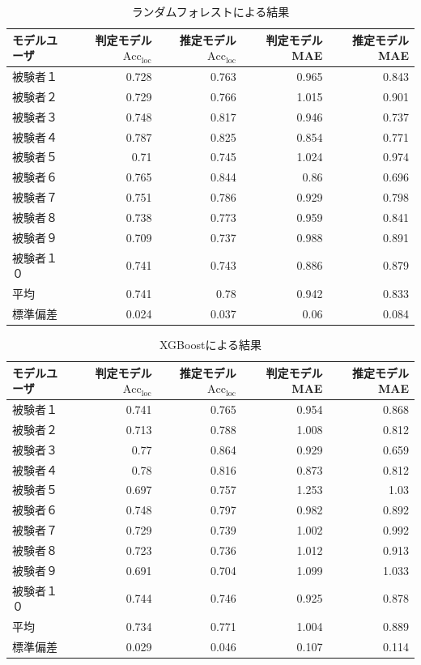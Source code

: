 \documentclass[a4paper,12pt]{jreport}
\begin{document}
\begin{table}[tb]
  \centering
  \caption{ランダムフォレストによる結果}
  \label{tab:RF_Acc}
  \renewcommand{\arraystretch}{1.2}
  \small
  \begin{tabular}{|l|r|r|r|r|}
    \hline
モデルユーザ & 判定モデル$\mathrm{Acc}_{\mathrm{loc}}$ & 推定モデル$\mathrm{Acc}_{\mathrm{loc}}$ & 判定モデルMAE & 推定モデルMAE \\ \hline
被験者１ & 0.728 & 0.763 & 0.965 & 0.843 \\ \hline
被験者２ & 0.729 & 0.766 & 1.015 & 0.901 \\ \hline
被験者３ & 0.748 & 0.817 & 0.946 & 0.737 \\ \hline
被験者４ & 0.787 & 0.825 & 0.854 & 0.771 \\ \hline
被験者５ & 0.71 & 0.745 & 1.024 & 0.974 \\ \hline
被験者６ & 0.765 & 0.844 & 0.86 & 0.696 \\ \hline
被験者７ & 0.751 & 0.786 & 0.929 & 0.798 \\ \hline
被験者８ & 0.738 & 0.773 & 0.959 & 0.841 \\ \hline
被験者９ & 0.709 & 0.737 & 0.988 & 0.891 \\ \hline
被験者１０ & 0.741 & 0.743 & 0.886 & 0.879 \\ \hline
平均 & 0.741 & 0.78 & 0.942 & 0.833 \\ \hline
標準偏差 & 0.024 & 0.037 & 0.06 & 0.084 \\ \hline
  \end{tabular}
\end{table}

\begin{table}[tb]
  \centering
  \caption{XGBoostによる結果}
  \label{tab:XGB_Acc}
  \renewcommand{\arraystretch}{1.2}
  \small
  \begin{tabular}{|l|r|r|r|r|}
    \hline
モデルユーザ & 判定モデル$\mathrm{Acc}_{\mathrm{loc}}$ & 推定モデル$\mathrm{Acc}_{\mathrm{loc}}$ & 判定モデルMAE & 推定モデルMAE \\ \hline
被験者１ & 0.741 & 0.765 & 0.954 & 0.868 \\ \hline
被験者２ & 0.713 & 0.788 & 1.008 & 0.812 \\ \hline
被験者３ & 0.77 & 0.864 & 0.929 & 0.659 \\ \hline
被験者４ & 0.78 & 0.816 & 0.873 & 0.812 \\ \hline
被験者５ & 0.697 & 0.757 & 1.253 & 1.03 \\ \hline
被験者６ & 0.748 & 0.797 & 0.982 & 0.892 \\ \hline
被験者７ & 0.729 & 0.739 & 1.002 & 0.992 \\ \hline
被験者８ & 0.723 & 0.736 & 1.012 & 0.913 \\ \hline
被験者９ & 0.691 & 0.704 & 1.099 & 1.033 \\ \hline
被験者１０ & 0.744 & 0.746 & 0.925 & 0.878 \\ \hline
平均 & 0.734 & 0.771 & 1.004 & 0.889 \\ \hline
標準偏差 & 0.029 & 0.046 & 0.107 & 0.114 \\ \hline
  \end{tabular}
\end{table}
\end{document}

